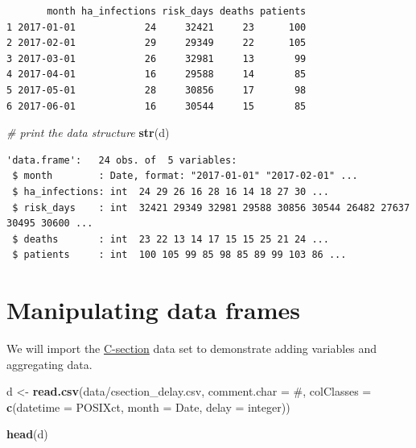 \documentclass[
]{book}
\newenvironment{Shaded}{\begin{snugshade}}{\end{snugshade}}
\newcommand{\AttributeTok}[1]{\textcolor[rgb]{0.13,0.29,0.53}{#1}}
\newcommand{\CommentTok}[1]{\textcolor[rgb]{0.56,0.35,0.01}{\textit{#1}}}
\newcommand{\FunctionTok}[1]{\textcolor[rgb]{0.13,0.29,0.53}{\textbf{#1}}}
\newcommand{\NormalTok}[1]{#1}
\newcommand{\OtherTok}[1]{\textcolor[rgb]{0.56,0.35,0.01}{#1}}
\newcommand{\StringTok}[1]{\textcolor[rgb]{0.31,0.60,0.02}{#1}}
\begin{document}
\begin{verbatim}
       month ha_infections risk_days deaths patients
1 2017-01-01            24     32421     23      100
2 2017-02-01            29     29349     22      105
3 2017-03-01            26     32981     13       99
4 2017-04-01            16     29588     14       85
5 2017-05-01            28     30856     17       98
6 2017-06-01            16     30544     15       85
\end{verbatim}

\begin{Shaded}
\begin{Highlighting}[]
\CommentTok{\# print the data structure}
\FunctionTok{str}\NormalTok{(d)}
\end{Highlighting}
\end{Shaded}

\begin{verbatim}
'data.frame':   24 obs. of  5 variables:
 $ month        : Date, format: "2017-01-01" "2017-02-01" ...
 $ ha_infections: int  24 29 26 16 28 16 14 18 27 30 ...
 $ risk_days    : int  32421 29349 32981 29588 30856 30544 26482 27637 30495 30600 ...
 $ deaths       : int  23 22 13 14 17 15 15 25 21 24 ...
 $ patients     : int  100 105 99 85 98 85 89 99 103 86 ...
\end{verbatim}

\section{Manipulating data frames}\label{manipulating-data-frames}

We will import the \hyperref[ceasearian-section-delay]{C-section} data set to demonstrate adding variables and aggregating data.

\begin{Shaded}
\begin{Highlighting}[]
\NormalTok{d }\OtherTok{\textless{}{-}} \FunctionTok{read.csv}\NormalTok{(}\StringTok{\textquotesingle{}data/csection\_delay.csv\textquotesingle{}}\NormalTok{,}
              \AttributeTok{comment.char =} \StringTok{\textquotesingle{}\#\textquotesingle{}}\NormalTok{,}
              \AttributeTok{colClasses   =} \FunctionTok{c}\NormalTok{(}\AttributeTok{datetime =} \StringTok{\textquotesingle{}POSIXct\textquotesingle{}}\NormalTok{,}
                               \AttributeTok{month    =} \StringTok{\textquotesingle{}Date\textquotesingle{}}\NormalTok{,}
                               \AttributeTok{delay    =} \StringTok{\textquotesingle{}integer\textquotesingle{}}\NormalTok{))}

\FunctionTok{head}\NormalTok{(d)}
\end{Highlighting}
\end{Shaded}
\end{document}
